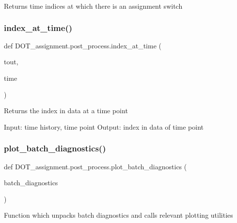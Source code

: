 \begin{DoxyVerb}Returns time indices at which there is an assignment switch\end{DoxyVerb}
 \mbox{\label{namespace_d_o_t__assignment_1_1post__process_a37b9bc57ea7c5c977fb3c3e30660e467}} 
\subsubsection{\texorpdfstring{index\_at\_time()}{index\_at\_time()}}
{\footnotesize\ttfamily def D\+O\+T\+\_\+assignment.\+post\+\_\+process.\+index\+\_\+at\+\_\+time (\begin{DoxyParamCaption}\item[{}]{tout,  }\item[{}]{time }\end{DoxyParamCaption})}

\begin{DoxyVerb}Returns the index in data at a time point

Input: time history, time point
Output: index in data of time point\end{DoxyVerb}
 \mbox{\label{namespace_d_o_t__assignment_1_1post__process_a9ef8af894bef78b4bd967a0e0298b141}} 
\subsubsection{\texorpdfstring{plot\_batch\_diagnostics()}{plot\_batch\_diagnostics()}}
{\footnotesize\ttfamily def D\+O\+T\+\_\+assignment.\+post\+\_\+process.\+plot\+\_\+batch\+\_\+diagnostics (\begin{DoxyParamCaption}\item[{}]{batch\+\_\+diagnostics }\end{DoxyParamCaption})}

\begin{DoxyVerb}Function which unpacks batch diagnostics and calls relevant plotting utilities
\end{DoxyVerb}
 \mbox{\label{namespace_d_o_t__assignment_1_1post__process_a132b56854e07708185775fca4cc1bcd3}} 

